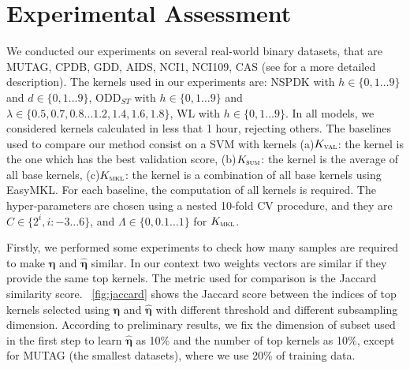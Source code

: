 \documentclass{esannV2}
\newcommand{\1}{{\bf 1}}
\newcommand{\kval}{$K_{\textsc{val}}$}
\newcommand{\ksum}{$K_{\textsc{sum}}$}
\newcommand{\kmkl}{$K_{\textsc{mkl}}$}
\begin{document}
\section{Experimental Assessment}
We conducted our experiments on several real-world binary datasets, that are MUTAG, CPDB, GDD, AIDS, NCI1, NCI109, CAS (see \cite{DaSanMartino2016,Shervashidze2011} for a more detailed description).
%
The kernels used in our experiments are:  NSPDK  with $h \in \{0,1\dots9\}$ and $d \in \{0,1\dots9\}$,  ODD$_{ST}$ with $h \in \{0,1\dots9\}$ and $\lambda \in \{0.5, 0.7,0.8\dots1.2,1.4,1.6,1.8\}$, WL with $h \in \{0,1\dots9\}$.
In all models, we considered kernels calculated in less that 1 hour, rejecting others.
The baselines used to compare our method consist on a SVM with kernels (a)\kval: the kernel is the one which has the best validation score, (b)\ksum: the kernel is the average of all base kernels, (c)\kmkl: the kernel is a combination of all base kernels using EasyMKL.
For each baseline, the computation of all kernels is required.
The hyper-parameters are chosen using a nested 10-fold CV procedure, and they are $C\in\{2^i, i:-3\dots6\}$, and $\Lambda\in\{0,0.1\dots1\}$ for \kmkl.


Firstly, we performed some experiments to check how many samples are required to make $\boldsymbol{\eta}$ and $\hat{\boldsymbol{\eta}}$ similar.
In our context two weights vectors are similar if they provide the same top kernels. The metric used for comparison is the Jaccard similarity score. \figurename\ \ref{fig:jaccard} shows the Jaccard score between the indices of top kernels selected using $\boldsymbol{\eta}$ and $\hat{\boldsymbol{\eta}}$ with different threshold and different subsampling dimension.
According to preliminary results, we fix the dimension of subset used in the first step to learn $\hat{\boldsymbol{\eta}}$ as 10\% and the number of top kernels as 10\%, except for MUTAG (the smallest datasets), where we use 20\% of training data.
\end{document}
